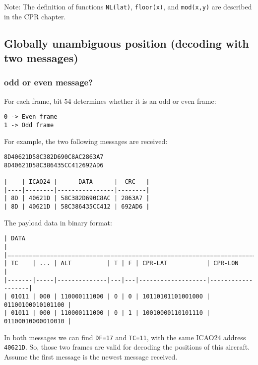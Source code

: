 Note: The definition of functions \texttt{NL(lat)}, \texttt{floor(x)}, and \texttt{mod(x,y)} are described in the CPR chapter.

\subsection{Globally unambiguous position (decoding with two messages)}\label{globally-unambiguous-position-decoding-with-two-messages}

\subsubsection{odd or even message?}\label{odd-or-even-message}

For each frame, bit 54 determines whether it is an odd or even frame:

\begin{verbatim}
0 -> Even frame
1 -> Odd frame
\end{verbatim}

For example, the two following messages are received:

\begin{verbatim}
8D40621D58C382D690C8AC2863A7
8D40621D58C386435CC412692AD6

|    | ICAO24 |      DATA      |  CRC   |
|----|--------|----------------|--------|
| 8D | 40621D | 58C382D690C8AC | 2863A7 |
| 8D | 40621D | 58C386435CC412 | 692AD6 |

\end{verbatim}

The payload data in binary format:

\begin{verbatim}
| DATA                                                                       |
|============================================================================|
| TC    | ... | ALT          | T | F | CPR-LAT           | CPR-LON           |
|-------|-----|--------------|---|---|-------------------|-------------------|
| 01011 | 000 | 110000111000 | 0 | 0 | 10110101101001000 | 01100100010101100 |
| 01011 | 000 | 110000111000 | 0 | 1 | 10010000110101110 | 01100010000010010 |
\end{verbatim}

In both messages we can find \texttt{DF=17} and \texttt{TC=11}, with the same ICAO24 address \texttt{40621D}. So, those two frames are valid for decoding the positions of this aircraft. Assume the first message is the newest message received.

